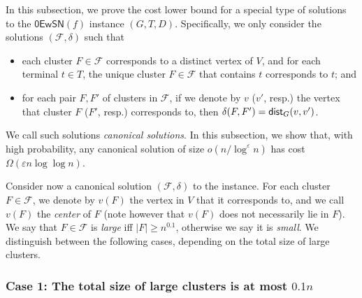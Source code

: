 \documentclass[11pt]{article}
\theoremstyle{definition}
\newcommand{\fset}{{\mathcal{F}}}
\newcommand{\eps}{{\varepsilon}}
\newcommand{\dist}{\textnormal{\textsf{dist}}}
\newcounter{note}
\newcommand{\zesn}{\mathsf{0EwSN}}
\begin{document}
\begin{titlepage}
In this subsection, we prove the cost lower bound for a special type of solutions to the $\zesn(f)$ instance $(G,T,D)$. Specifically, we only consider the solutions $(\fset, \delta)$ such that 
\begin{itemize}
\item each cluster $F\in \fset$ corresponds to a distinct vertex of $V$, and for each terminal $t\in T$, the unique cluster $F\in \fset$ that contains $t$ corresponds to $t$; and
\item for each pair $F,F'$ of clusters in $\fset$, if we denote by $v$ ($v'$, resp.) the vertex that cluster $F$ ($F'$, resp.) corresponds to, then $\delta(F,F')=\dist_{G}(v,v')$.
\end{itemize}
We call such solutions \emph{canonical solutions}.
%
In this subsection, we show that, with high probability, any canonical solution of size $o(n/\log^{\eps} n)$ has cost $\Omega(\eps n\log \log n)$. 

Consider now a canonical solution $(\fset,\delta)$ to the instance. For each cluster $F\in \fset$, we denote by $v(F)$ the vertex in $V$ that it corresponds to, and we call $v(F)$ the \emph{center} of $F$ (note however that $v(F)$ does not necessarily lie in $F$). We say that $F\in \fset$ is \emph{large} iff $|F|\ge n^{0.1}$, otherwise we say it is \emph{small}. 
We distinguish between the following cases, depending on the total size of large clusters.
%

\subsubsection*{Case 1: The total size of large clusters is at most $0.1n$}


\end{titlepage}
\end{document}
